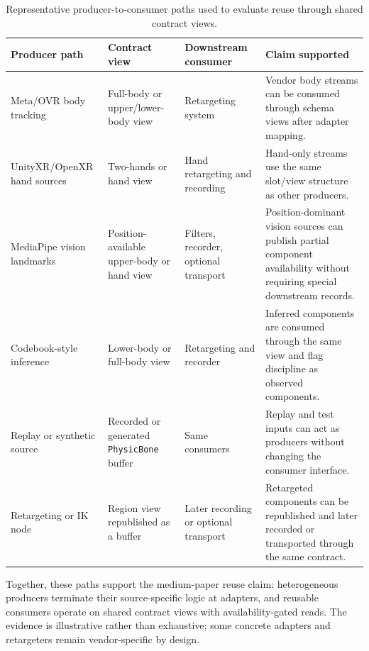 \documentclass[runningheads]{llncs}
\begin{document}
\begin{table}[t]
	\caption{Representative producer-to-consumer paths used to evaluate reuse through shared contract views.}\label{tab:producer-consumer}
	\centering
	\scriptsize
	\begin{tabular}{@{}P{28mm}P{24mm}P{28mm}P{39mm}@{}}
		\toprule
		Producer path               & Contract view                                    & Downstream consumer                   & Claim supported                                                                                                           \\
		\midrule
		Meta/OVR body tracking      & Full-body or upper/lower-body view               & Retargeting system                    & Vendor body streams can be consumed through schema views after adapter mapping.                                           \\
		UnityXR/OpenXR hand sources & Two-hands or hand view                           & Hand retargeting and recording        & Hand-only streams use the same slot/view structure as other producers.                                                    \\
		MediaPipe vision landmarks  & Position-available upper-body or hand view       & Filters, recorder, optional transport & Position-dominant vision sources can publish partial component availability without requiring special downstream records. \\
		Codebook-style inference    & Lower-body or full-body view                     & Retargeting and recorder              & Inferred components are consumed through the same view and flag discipline as observed components.                        \\
		Replay or synthetic source  & Recorded or generated \texttt{PhysicBone} buffer & Same consumers         & Replay and test inputs can act as producers without changing the consumer interface.                                      \\
		Retargeting or IK node      & Region view republished as a buffer              & Later recording or optional transport & Retargeted components can be republished and later recorded or transported through the same contract.                     \\
		\bottomrule
	\end{tabular}
\end{table}

Together, these paths support the medium-paper reuse claim: heterogeneous producers terminate their source-specific logic at adapters, and reusable consumers operate on shared contract views with availability-gated reads. The evidence is illustrative rather than exhaustive; some concrete adapters and retargeters remain vendor-specific by design.
\end{document}
